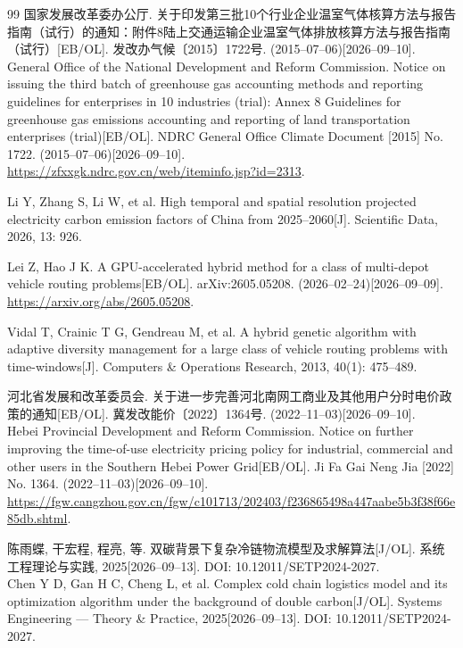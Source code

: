 \documentclass{setp-new}
\begin{document}
\begin{thebibliography}{99}
 国家发展改革委办公厅. 关于印发第三批10个行业企业温室气体核算方法与报告指南（试行）的通知：附件8陆上交通运输企业温室气体排放核算方法与报告指南（试行）\mbox{[EB/OL]}. 发改办气候〔2015〕1722号. (2015--07--06)[2026--09--10].\\
General Office of the National Development and Reform Commission. Notice on issuing the third batch of greenhouse gas accounting methods and reporting guidelines for enterprises in 10 industries (trial): Annex 8 Guidelines for greenhouse gas emissions accounting and reporting of land transportation enterprises (trial)\mbox{[EB/OL]}. NDRC General Office Climate Document [2015] No. 1722. (2015--07--06)[2026--09--10].\\
\url{https://zfxxgk.ndrc.gov.cn/web/iteminfo.jsp?id=2313}.

 Li Y, Zhang S, Li W, et al. High temporal and spatial resolution projected electricity carbon emission factors of China from 2025--2060[J]. Scientific Data, 2026, 13: 926.

 Lei Z, Hao J K. A GPU-accelerated hybrid method for a class of multi-depot vehicle routing problems\mbox{[EB/OL]}. arXiv:2605.05208. (2026--02--24)[2026--09--09].\\
\url{https://arxiv.org/abs/2605.05208}.

 Vidal T, Crainic T G, Gendreau M, et al. A hybrid genetic algorithm with adaptive diversity management for a large class of vehicle routing problems with time-windows[J]. Computers \& Operations Research, 2013, 40(1): 475--489.


 河北省发展和改革委员会. 关于进一步完善河北南网工商业及其他用户分时电价政策的通知\mbox{[EB/OL]}. 冀发改能价〔2022〕1364号. (2022--11--03)[2026--09--10].\\
Hebei Provincial Development and Reform Commission. Notice on further improving the time-of-use electricity pricing policy for industrial, commercial and other users in the Southern Hebei Power Grid\mbox{[EB/OL]}. Ji Fa Gai Neng Jia [2022] No. 1364. (2022--11--03)[2026--09--10].\\
\url{https://fgw.cangzhou.gov.cn/fgw/c101713/202403/f236865498a447aabe5b3f38f66e85db.shtml}.

 陈雨蝶, 干宏程, 程亮, 等. 双碳背景下复杂冷链物流模型及求解算法\mbox{[J/OL]}. 系统工程理论与实践, 2025[2026--09--13]. DOI: 10.12011/SETP2024-2027.\\
Chen Y D, Gan H C, Cheng L, et al. Complex cold chain logistics model and its optimization algorithm under the background of double carbon\mbox{[J/OL]}. Systems Engineering --- Theory \& Practice, 2025[2026--09--13]. DOI: 10.12011/SETP2024-2027.

\endgroup
\end{thebibliography}
\end{document}
